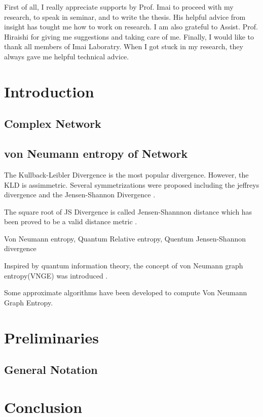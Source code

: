 \documentclass[senior,final,11pt]{iscs-thesis}
\begin{document}
\begin{acknowledge}
    First of all, I really appreciate supports by Prof. Imai to proceed with my
    research, to speak in seminar, and to write the thesis. His helpful advice from insight has tought me how to work on research. I am also grateful to Assist. Prof. Hiraishi for giving me suggestions and taking care of me. Finally, I would like to thank all members of Imai Laboratry. When
    I got stuck in my research, they always gave me helpful technical advice.
\end{acknowledge}

\frontmatter %
\tableofcontents %
\mainmatter %

\chapter{Introduction}
\section{Complex Network}
\section{von Neumann entropy of Network}

The Kullback-Leibler Divergence \cite{kullback1951information} is the most popular divergence.
However, the KLD is assimmetric.
Several symmetrizations \cite{nielsen2019jensen} were proposed including the jeffreys divergence \cite{jeffreys1946invariant} and the Jensen-Shannon Divergence \cite{lin1991divergence}.

The square root of JS Divergence is called Jensen-Shannnon distance which has been proved to be a valid distance metric \cite{endres2003new}.

Von Neumann entropy,
Quantum Relative entropy,
Quentum Jensen-Shannon divergence \cite{briet2009properties, lamberti2008metric}

Inspired by quantum information theory, the concept of von Neumann graph entropy(VNGE) was introduced \cite{braunstein2006laplacian}.

Some approximate algorithms have been developed to compute Von Neumann Graph Entropy\cite{chen2019fast,tsitsulin2020just}.

\chapter{Preliminaries}
\section{General Notation}

\chapter{Conclusion}

\end{document}
